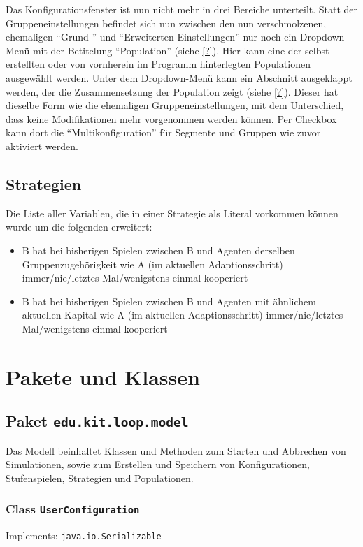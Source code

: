 \documentclass[parskip=full,11pt]{scrartcl}
\begin{document}
Das Konfigurationsfenster ist nun nicht mehr in drei Bereiche unterteilt. Statt der Gruppeneinstellungen befindet sich nun zwischen den nun verschmolzenen, ehemaligen \enquote{Grund-} und \enquote{Erweiterten Einstellungen} nur noch ein Dropdown-Menü mit der Betitelung \enquote{Population} (siehe \cref{?}). Hier kann eine der selbst erstellten oder von vornherein im Programm hinterlegten Populationen ausgewählt werden. Unter dem Dropdown-Menü kann ein Abschnitt ausgeklappt werden, der die Zusammensetzung der Population zeigt (siehe \cref{?}). Dieser hat dieselbe Form wie die ehemaligen Gruppeneinstellungen, mit dem Unterschied, dass keine Modifikationen mehr vorgenommen werden können. Per Checkbox kann dort die \enquote{Multikonfiguration} für Segmente und Gruppen wie zuvor aktiviert werden.

\subsection{Strategien}
Die Liste aller Variablen, die in einer Strategie als Literal vorkommen können wurde um die folgenden erweitert:

\begin{itemize}
\item B hat bei bisherigen Spielen zwischen B und Agenten derselben Gruppenzugehörigkeit wie A (im aktuellen Adaptionsschritt) immer/nie/letztes Mal/wenigstens einmal kooperiert
\item B hat bei bisherigen Spielen zwischen B und Agenten mit ähnlichem aktuellen Kapital wie A (im aktuellen Adaptionsschritt) immer/nie/letztes Mal/wenigstens einmal kooperiert
\end{itemize}

\section{Pakete und Klassen}
\subsection{Paket \texttt{edu.kit.loop.model}}
Das Modell beinhaltet Klassen und Methoden zum Starten und Abbrechen von Simulationen, sowie zum Erstellen und Speichern von Konfigurationen, Stufenspielen, Strategien und Populationen.

\subsubsection{Class \texttt{UserConfiguration}}
Implements: \texttt{java.io.Serializable}
\end{document}
